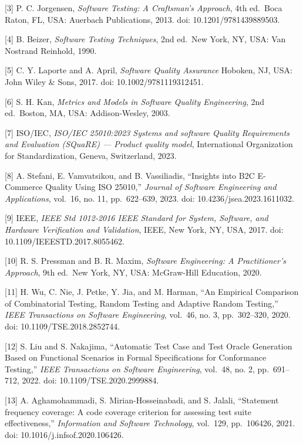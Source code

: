 \documentclass[
  12pt,
]{report}
\begin{document}
{[}3{]} P. C. Jorgensen, \emph{Software Testing: A Craftsman's
Approach}, 4th ed.~Boca Raton, FL, USA: Auerbach Publications, 2013.
doi: 10.1201/9781439889503.

{[}4{]} B. Beizer, \emph{Software Testing Techniques}, 2nd ed.~New York,
NY, USA: Van Nostrand Reinhold, 1990.

{[}5{]} C. Y. Laporte and A. April, \emph{Software Quality Assurance}
Hoboken, NJ, USA: John Wiley \& Sons, 2017. doi: 10.1002/9781119312451.

{[}6{]} S. H. Kan, \emph{Metrics and Models in Software Quality
Engineering}, 2nd ed.~Boston, MA, USA: Addison-Wesley, 2003.

{[}7{]} ISO/IEC, \emph{ISO/IEC 25010:2023 Systems and software Quality
Requirements and Evaluation (SQuaRE) --- Product quality model},
International Organization for Standardization, Geneva, Switzerland,
2023.

{[}8{]} A. Stefani, E. Vamvatsikou, and B. Vassiliadis, ``Insights into
B2C E-Commerce Quality Using ISO 25010,'' \emph{Journal of Software
Engineering and Applications}, vol.~16, no. 11, pp.~622--639, 2023. doi:
10.4236/jsea.2023.1611032.

{[}9{]} IEEE, \emph{IEEE Std 1012-2016 IEEE Standard for System,
Software, and Hardware Verification and Validation}, IEEE, New York, NY,
USA, 2017. doi: 10.1109/IEEESTD.2017.8055462.

{[}10{]} R. S. Pressman and B. R. Maxim, \emph{Software Engineering: A
Practitioner's Approach}, 9th ed.~New York, NY, USA: McGraw-Hill
Education, 2020.

{[}11{]} H. Wu, C. Nie, J. Petke, Y. Jia, and M. Harman, ``An Empirical
Comparison of Combinatorial Testing, Random Testing and Adaptive Random
Testing,'' \emph{IEEE Transactions on Software Engineering}, vol.~46,
no. 3, pp.~302--320, 2020. doi: 10.1109/TSE.2018.2852744.

{[}12{]} S. Liu and S. Nakajima, ``Automatic Test Case and Test Oracle
Generation Based on Functional Scenarios in Formal Specifications for
Conformance Testing,'' \emph{IEEE Transactions on Software Engineering},
vol.~48, no. 2, pp.~691--712, 2022. doi: 10.1109/TSE.2020.2999884.

{[}13{]} A. Aghamohammadi, S. Mirian-Hosseinabadi, and S. Jalali,
``Statement frequency coverage: A code coverage criterion for assessing
test suite effectiveness,'' \emph{Information and Software Technology},
vol.~129, pp.~106426, 2021. doi: 10.1016/j.infsof.2020.106426.
\end{document}
